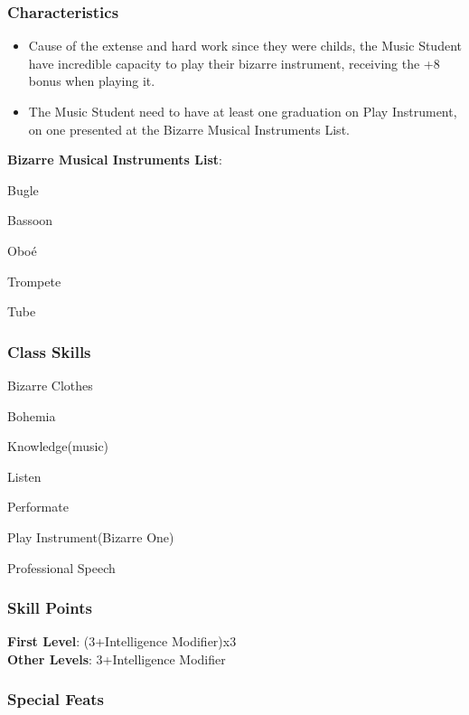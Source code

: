 \documentclass[ letterpaper,12pt]{article}
\begin{document}
\subsubsection{Characteristics}
\begin{itemize}
\item{Cause of the extense and hard work  since they were childs, the Music Student  have incredible   capacity   to   play   their bizarre  instrument,  receiving  the   +8 bonus when playing it.}
\item{The Music Student need to have  at  least one graduation on Play Instrument, on one presented  at   the    Bizarre    Musical Instruments List.}
\end{itemize}

{\bf Bizarre Musical Instruments List}:\\
\begin{itemize}
{\it 
\item{Bugle}
\item{Bassoon}
\item{Oboé}
\item{Trompete}
\item{Tube}
}
\end{itemize}

\subsubsection{Class Skills}
\begin{itemize}
{\it 
\item{Bizarre Clothes}
\item{Bohemia}
\item{Knowledge(music)}
\item{Listen}
\item{Performate}
\item{Play Instrument(Bizarre One)}
\item{Professional Speech}
}
\end{itemize}

\subsubsection{Skill Points}
{\bf First Level}: (3+Intelligence Modifier)x3\\
{\bf Other Levels}: 3+Intelligence Modifier\\

\subsubsection{Special Feats}
\end{document}
